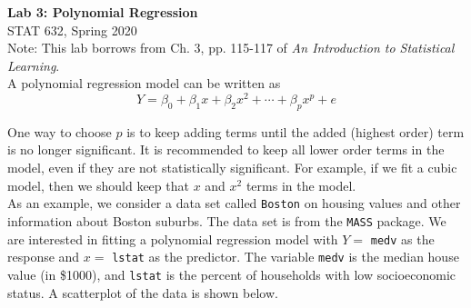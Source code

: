 \documentclass[11pt]{article}\usepackage[]{graphicx}\usepackage[]{color}
\begin{document}
\setlength\parindent{0pt}

\large \textbf{Lab 3: Polynomial Regression}\\
\normalsize STAT 632, Spring 2020\\

Note: This lab borrows from Ch. 3, pp. 115-117 of \emph{An Introduction to Statistical Learning}.\\

A polynomial regression model can be written as 
$$ Y = \beta_0 + \beta_1 x + \beta_2 x^2 + \cdots + \beta_p x^p + e$$

One way to choose $p$ is to keep adding terms until the added (highest order) term is no longer significant.  It is recommended to keep all lower order terms in the model, even if they are not statistically significant.  For example, if we fit a cubic model, then we should keep that $x$ and $x^2$ terms in the model.\\  

As an example, we consider a data set called \texttt{Boston} on housing values and other information about Boston suburbs.  The data set is from the \texttt{MASS} package.  We are interested in fitting a polynomial regression model with $Y=$ \texttt{medv} as the response and $x=$ \texttt{lstat} as the predictor.  The variable \texttt{medv} is the median house value (in \$1000), and \texttt{lstat} is the percent of households with low socioeconomic status.  A scatterplot of the data is shown below.
\end{document}
